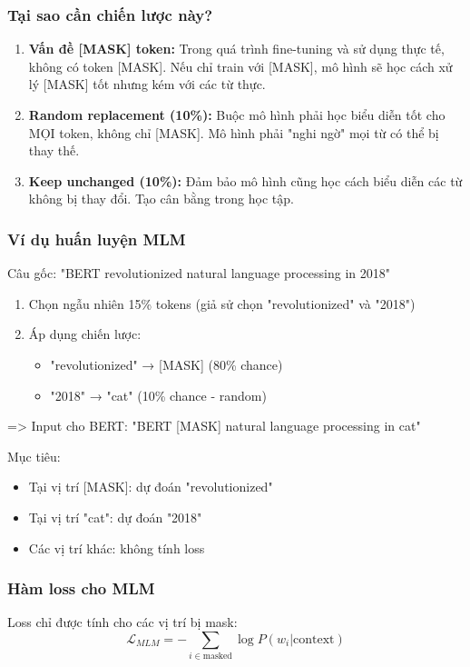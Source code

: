 \subsubsection{Tại sao cần chiến lược này?}
\begin{enumerate}
    \item \textbf{Vấn đề [MASK] token:} Trong quá trình fine-tuning và sử dụng thực tế, không có token [MASK]. Nếu chỉ train với [MASK], mô hình sẽ học cách xử lý [MASK] tốt nhưng kém với các từ thực.
    
    \item \textbf{Random replacement (10\%):} Buộc mô hình phải học biểu diễn tốt cho MỌI token, không chỉ [MASK]. Mô hình phải "nghi ngờ" mọi từ có thể bị thay thế.
    
    \item \textbf{Keep unchanged (10\%):} Đảm bảo mô hình cũng học cách biểu diễn các từ không bị thay đổi. Tạo cân bằng trong học tập.
\end{enumerate}

\subsubsection{Ví dụ huấn luyện MLM}
Câu gốc: "BERT revolutionized natural language processing in 2018"
\begin{enumerate}
    \item Chọn ngẫu nhiên 15\% tokens (giả sử chọn "revolutionized" và "2018")

    \item Áp dụng chiến lược:
    \begin{itemize}
        \item "revolutionized" → [MASK] (80\% chance)
        \item "2018" → "cat" (10\% chance - random)
    \end{itemize}
\end{enumerate}

=> Input cho BERT: "BERT [MASK] natural language processing in cat"

Mục tiêu: 
\begin{itemize}
    \item Tại vị trí [MASK]: dự đoán "revolutionized"
    \item Tại vị trí "cat": dự đoán "2018"
    \item Các vị trí khác: không tính loss
\end{itemize}

\subsubsection{Hàm loss cho MLM}
Loss chỉ được tính cho các vị trí bị mask:
$$ \mathcal{L}_{MLM} = -\sum_{i \in \text{masked}} \log P(w_i | \text{context}) $$

